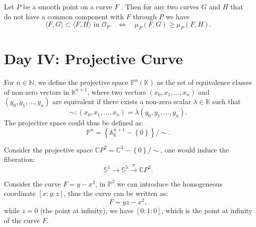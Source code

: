 \documentclass[10pt]{article}
\begin{document}
\begin{theorem}
  Let $ P$  be a smooth point on a curve $ F$ . Then for any two curves $G$  and $H$  that do not have a common component with $F$ through $P$  we have
  \begin{equation*}
    \langle F,G\rangle\subset\langle F,H\rangle\text{ in }\mathscr{O}_P\quad\Leftrightarrow\quad\mu_P(F,G)\geq\mu_P(F,H).
  \end{equation*}
\end{theorem}

\section{Day IV: Projective Curve}

\begin{definition}
  For $ n \in \mathbb{N}$, we define the projective space $ \mathbb{P}^{n}(\mathbb{K})$ as the set of equivalence classes of non-zero vectors in $ \mathbb{K}^{n+1}$, where two vectors $ (x_0, x_1, \ldots, x_n)$ and $ (y_0, y_1, \ldots, y_n)$ are equivalent if there exists a non-zero scalar $ \lambda \in \mathbb{K}$ such that
  \begin{equation*}
    \sim : (x_0, x_1, \ldots, x_n) = \lambda (y_0, y_1, \ldots, y_n).
  \end{equation*}
  The projective space could thus be defined as:
  \begin{equation*}
    \mathbb{P}^{n} = \left\{ \mathbb{A}_{\mathbb{K}}^{n+1} - \left\{ 0 \right\} \right\}/\sim .
  \end{equation*}
\end{definition}

\begin{example}
  Consider the projective space $ \mathbb{C}P^{2} = \mathbb{C}^{3} - \left\{ 0 \right\} / \sim $, one would induce the fiberation:
  \begin{equation*}
    \mathbb{S}^{1} \rightarrow \mathbb{S}^{5} \xrightarrow{\pi} \mathbb{C}P^{2}.
  \end{equation*}
\end{example}

\begin{example}
  Consider the curve $ F = y - x^{2}$, in $ \mathbb{P}^{2}$ we can introduce the homogeneous coordinate $[x:y:z]$, thus the curve can be written as:
  \begin{equation*}
    F = yz - x^{2},
  \end{equation*}
  while $ z = 0$ (the point at infinity), we have $[0:1:0]$, which is the point at infinity of the curve $ F$.
\end{example}

\label{LastPage}
\end{document}
